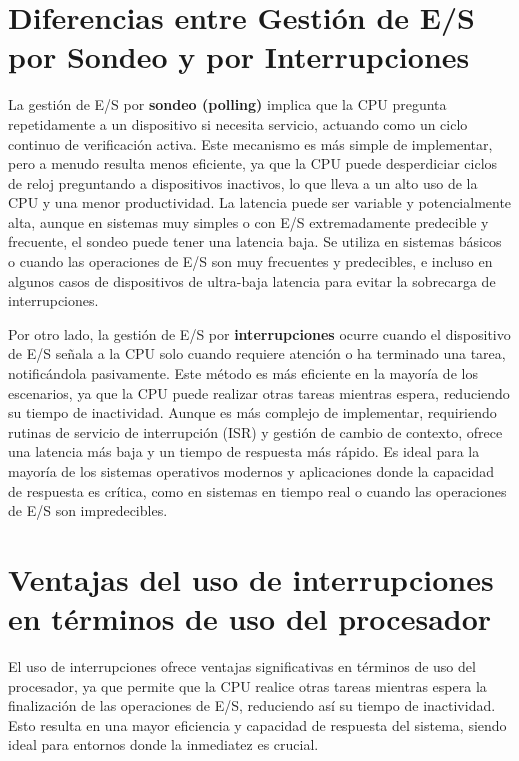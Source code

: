 \documentclass[12pt,a4paper]{article}
\begin{document}
	
	\section{Diferencias entre Gestión de E/S por Sondeo y por Interrupciones}
	
	La gestión de E/S por \textbf{sondeo (polling)} implica que la CPU pregunta repetidamente a un dispositivo si necesita servicio, actuando como un ciclo continuo de verificación activa. Este mecanismo es más simple de implementar, pero a menudo resulta menos eficiente, ya que la CPU puede desperdiciar ciclos de reloj preguntando a dispositivos inactivos, lo que lleva a un alto uso de la CPU y una menor productividad. La latencia puede ser variable y potencialmente alta, aunque en sistemas muy simples o con E/S extremadamente predecible y frecuente, el sondeo puede tener una latencia baja. Se utiliza en sistemas básicos o cuando las operaciones de E/S son muy frecuentes y predecibles, e incluso en algunos casos de dispositivos de ultra-baja latencia para evitar la sobrecarga de interrupciones.
	
	Por otro lado, la gestión de E/S por \textbf{interrupciones} ocurre cuando el dispositivo de E/S señala a la CPU solo cuando requiere atención o ha terminado una tarea, notificándola pasivamente. Este método es más eficiente en la mayoría de los escenarios, ya que la CPU puede realizar otras tareas mientras espera, reduciendo su tiempo de inactividad. Aunque es más complejo de implementar, requiriendo rutinas de servicio de interrupción (ISR) y gestión de cambio de contexto, ofrece una latencia más baja y un tiempo de respuesta más rápido. Es ideal para la mayoría de los sistemas operativos modernos y aplicaciones donde la capacidad de respuesta es crítica, como en sistemas en tiempo real o cuando las operaciones de E/S son impredecibles.
	
	
	\section{Ventajas del uso de interrupciones en términos de uso del procesador}
	
	El uso de interrupciones ofrece ventajas significativas en términos de uso del procesador, ya que permite que la CPU realice otras tareas mientras espera la finalización de las operaciones de E/S, reduciendo así su tiempo de inactividad. Esto resulta en una mayor eficiencia y capacidad de respuesta del sistema, siendo ideal para entornos donde la inmediatez es crucial.
	
\end{document}
